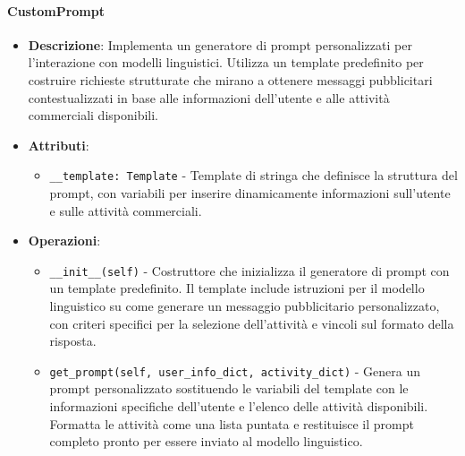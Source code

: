 \documentclass[10pt]{article}
\begin{document}
    \paragraph{CustomPrompt}
    \begin{itemize} 
    \item \textbf{Descrizione}: Implementa un generatore di prompt personalizzati per l'interazione con modelli linguistici. Utilizza un template predefinito per costruire richieste strutturate che mirano a ottenere messaggi pubblicitari contestualizzati in base alle informazioni dell'utente e alle attività commerciali disponibili.
    \item \textbf{Attributi}:
    \begin{itemize}
        \item \texttt{\_\_template: Template} - Template di stringa che definisce la struttura del prompt, con variabili per inserire dinamicamente informazioni sull'utente e sulle attività commerciali.
    \end{itemize}
    
    \item \textbf{Operazioni}:
    \begin{itemize}
        \item \texttt{\_\_init\_\_(self)} - Costruttore che inizializza il generatore di prompt con un template predefinito. Il template include istruzioni per il modello linguistico su come generare un messaggio pubblicitario personalizzato, con criteri specifici per la selezione dell'attività e vincoli sul formato della risposta.
        
        \item \texttt{get\_prompt(self, user\_info\_dict, activity\_dict)} - Genera un prompt personalizzato sostituendo le variabili del template con le informazioni specifiche dell'utente e l'elenco delle attività disponibili. Formatta le attività come una lista puntata e restituisce il prompt completo pronto per essere inviato al modello linguistico.
    \end{itemize}
    \end{itemize}
\end{document}

